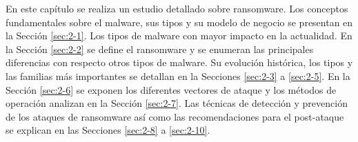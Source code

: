 


\noindent En este capítulo se realiza un estudio detallado sobre ransomware. Los conceptos fundamentales sobre el malware, sus tipos y su modelo de negocio se presentan en la Sección \ref{sec:2-1}. Los tipos de malware con mayor impacto en la actualidad. En la Sección \ref{sec:2-2} se define el ransomware y se enumeran las principales diferencias con respecto otros tipos de malware. Su evolución histórica, los tipos  y las familias más importantes se detallan en la Secciones \ref{sec:2-3} a \ref{sec:2-5}. En la Sección \ref{sec:2-6} se exponen los diferentes vectores de ataque y los métodos de operación analizan en la Sección \ref{sec:2-7}.  Las técnicas de detección y prevención de los ataques de ransomware así como las recomendaciones para el post-ataque se explican en las Secciones \ref{sec:2-8} a \ref{sec:2-10}.


